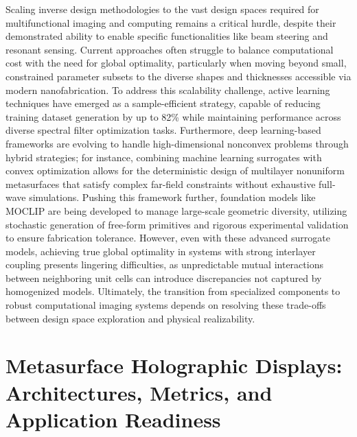Scaling inverse design methodologies to the vast design spaces required for multifunctional imaging and computing remains a critical hurdle, despite their demonstrated ability to enable specific functionalities like beam steering and resonant sensing. Current approaches often struggle to balance computational cost with the need for global optimality, particularly when moving beyond small, constrained parameter subsets to the diverse shapes and thicknesses accessible via modern nanofabrication. To address this scalability challenge, active learning techniques have emerged as a sample-efficient strategy, capable of reducing training dataset generation by up to 82\% while maintaining performance across diverse spectral filter optimization tasks. \citep{doi_10_1364_oe_559669_898a2205} Furthermore, deep learning-based frameworks are evolving to handle high-dimensional nonconvex problems through hybrid strategies; for instance, combining machine learning surrogates with convex optimization allows for the deterministic design of multilayer nonuniform metasurfaces that satisfy complex far-field constraints without exhaustive full-wave simulations. Pushing this framework further, foundation models like MOCLIP are being developed to manage large-scale geometric diversity, utilizing stochastic generation of free-form primitives and rigorous experimental validation to ensure fabrication tolerance. However, even with these advanced surrogate models, achieving true global optimality in systems with strong interlayer coupling presents lingering difficulties, as unpredictable mutual interactions between neighboring unit cells can introduce discrepancies not captured by homogenized models. Ultimately, the transition from specialized components to robust computational imaging systems depends on resolving these trade-offs between design space exploration and physical realizability. \citep{doi_10_1364_oe_559669_898a2205} \citep{doi_10_1038_s41467_026_76714_x_8ca5d39b} \citep{doi_10_1109_tap_2021_3137496_d4a1d597}

\section{Metasurface Holographic Displays: Architectures, Metrics, and Application Readiness}\label{metasurface-holographic-displays-architectures-metrics-and-application-readiness}

